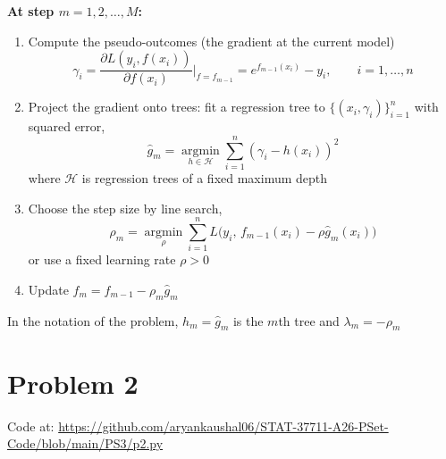 \documentclass{article}
\begin{document}
\begin{enumerate}[label=\alph*.]
\textbf{At step $m=1,2,\ldots,M$:}
\begin{enumerate}[label=\arabic*.]
\item Compute the pseudo-outcomes (the gradient at the current model)
\[\gamma_i=\frac{\partial L(y_i,f(x_i))}{\partial f(x_i)}\Big|_{f=f_{m-1}}=e^{f_{m-1}(x_i)}-y_i,\qquad i=1,\ldots,n\]
\item Project the gradient onto trees: fit a regression tree to $\{(x_i,\gamma_i)\}_{i=1}^n$ with squared error,
\[\hat g_m=\operatorname*{argmin}_{h\in\mathcal H}\sum_{i=1}^n(\gamma_i-h(x_i))^2\]
where $\mathcal H$ is regression trees of a fixed maximum depth
\item Choose the step size by line search,
\[\rho_m=\operatorname*{argmin}_\rho\sum_{i=1}^nL\big(y_i,\,f_{m-1}(x_i)-\rho\hat g_m(x_i)\big)\]
or use a fixed learning rate $\rho>0$
\item Update $f_m=f_{m-1}-\rho_m\hat g_m$
\end{enumerate}

In the notation of the problem, $h_m=\hat g_m$ is the $m$th tree and $\lambda_m=-\rho_m$
\end{enumerate}

\section*{Problem 2}
Code at: \url{https://github.com/aryankaushal06/STAT-37711-A26-PSet-Code/blob/main/PS3/p2.py}
\end{document}
